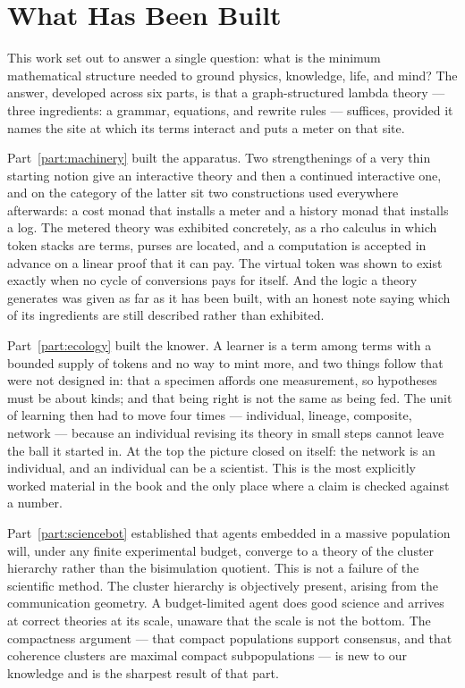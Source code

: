 \chapter*{What Has Been Built}

This work set out to answer a single question: what is the minimum
mathematical structure needed to ground physics, knowledge, life, and
mind?
The answer, developed across six parts, is that a graph-structured lambda
theory --- three ingredients: a grammar, equations, and rewrite rules ---
suffices, provided it names the site at which its terms interact and puts
a meter on that site.

Part~\ref{part:machinery} built the apparatus.
Two strengthenings of a very thin starting notion give an interactive
theory and then a continued interactive one, and on the category of the
latter sit two constructions used everywhere afterwards: a cost monad
that installs a meter and a history monad that installs a log.
The metered theory was exhibited concretely, as a rho calculus in which
token stacks are terms, purses are located, and a computation is accepted
in advance on a linear proof that it can pay.
The virtual token was shown to exist exactly when no cycle of conversions
pays for itself.
And the logic a theory generates was given as far as it has been built,
with an honest note saying which of its ingredients are still described
rather than exhibited.

Part~\ref{part:ecology} built the knower.
A learner is a term among terms with a bounded supply of tokens and no
way to mint more, and two things follow that were not designed in: that a
specimen affords one measurement, so hypotheses must be about kinds; and
that being right is not the same as being fed.
The unit of learning then had to move four times --- individual, lineage,
composite, network --- because an individual revising its theory in small
steps cannot leave the ball it started in.
At the top the picture closed on itself: the network is an individual,
and an individual can be a scientist.
This is the most explicitly worked material in the book and the only
place where a claim is checked against a number.

Part~\ref{part:sciencebot} established that agents embedded in a massive
population will, under any finite experimental budget, converge to a
theory of the cluster hierarchy rather than the bisimulation quotient.
This is not a failure of the scientific method.
The cluster hierarchy is objectively present, arising from the
communication geometry.
A budget-limited agent does good science and arrives at correct theories
at its scale, unaware that the scale is not the bottom.
The compactness argument --- that compact populations support consensus,
and that coherence clusters are maximal compact subpopulations --- is new
to our knowledge and is the sharpest result of that part.


